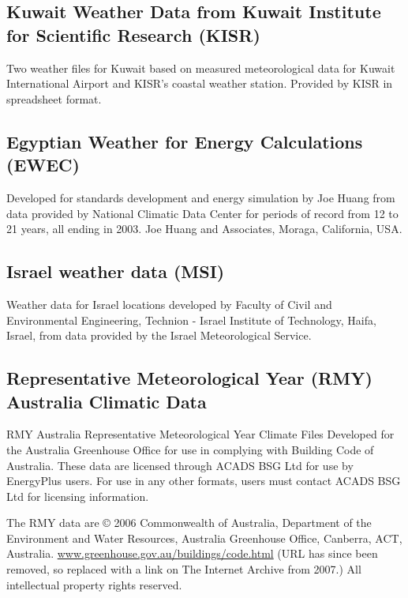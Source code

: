 \subsection{Kuwait Weather Data from Kuwait Institute for Scientific Research (KISR)}\label{kuwait-weather-data-from-kuwait-institute-for-scientific-research-kisr}

Two weather files for Kuwait based on measured meteorological data for Kuwait International Airport and KISR's coastal weather station. Provided by KISR in spreadsheet format.

\subsection{Egyptian Weather for Energy Calculations (EWEC)}\label{egyptian-weather-for-energy-calculations-ewec}

Developed for standards development and energy simulation by Joe Huang from data provided by National Climatic Data Center for periods of record from 12 to 21 years, all ending in 2003. Joe Huang and Associates, Moraga, California, USA.

\subsection{Israel weather data (MSI)}\label{israel-weather-data-msi}

Weather data for Israel locations developed by Faculty of Civil and Environmental Engineering, Technion - Israel Institute of Technology, Haifa, Israel, from data provided by the Israel Meteorological Service.

\subsection{Representative Meteorological Year (RMY) Australia Climatic Data}\label{representative-meteorological-year-rmy-australia-climatic-data}

RMY Australia Representative Meteorological Year Climate Files Developed for the Australia Greenhouse Office for use in complying with Building Code of Australia. These data are licensed through ACADS BSG Ltd for use by EnergyPlus users. For use in any other formats, users must contact ACADS BSG Ltd for licensing information.

The RMY data are © 2006 Commonwealth of Australia, Department of the Environment and Water Resources, Australia Greenhouse Office, Canberra, ACT, Australia. \href{https://web.archive.org/web/20070608213812/http://www.greenhouse.gov.au/buildings/code.html}{www.greenhouse.gov.au/buildings/code.html} (URL has since been removed, so replaced with a link on The Internet Archive from 2007.) All intellectual property rights reserved.

